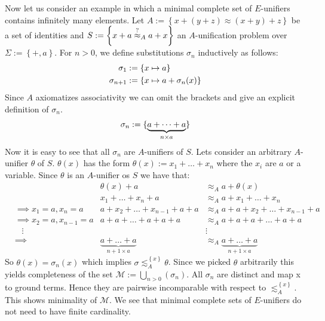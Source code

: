 Now let us consider an example in which a minimal complete set of $E$-unifiers contains infinitely many elements. Let $A:=\left\lbrace x+(y+z)\approx (x+y)+z\right\rbrace $ be a set of identities and $S:=\left\lbrace x+a\stackrel{?}{\approx}_A a+x\right\rbrace$ an $A$-unification problem over $\Sigma:=\left\lbrace +,a\right\rbrace$. For $n>0$, we define substitutions $\sigma_n$ inductively as follows:
\begin{align}
\sigma_1&:=\left\lbrace x\mapsto a\right\rbrace\notag\\
\sigma_{n+1}&:=\left\lbrace x\mapsto a+\sigma_n(x)\right\rbrace\notag
\end{align}
Since $A$ axiomatizes associativity we can omit the brackets and give an explicit definition of $\sigma_n$.
\begin{align}
\sigma_n:=\lbrace\underbrace{a+\dots+a}_{n\times a} \rbrace\notag
\end{align}
Now it is easy to see that all $\sigma_n$ are $A$-unifiers of $S$.
Lets consider an arbitrary $A$-unifier $\theta$ of $S$. $\theta(x)$ has the form $\theta(x):=x_1+\dots+x_n$ where the $x_i$ are $a$ or a variable.
Since $\theta$ is an $A$-unifier os $S$ we have that:
\begin{align*}
&&\theta(x)+a&\approx_A a+\theta(x)\\
&& x_1+\dots+x_n+a&\approx_A a+x_1+\dots+x_n\\
&\implies x_1=a,x_n=a& a+x_2+\dots+x_{n-1}+a+a&\approx_A a+a+x_2+\dots+x_{n-1}+a\\
&\implies x_2=a,x_{n-1}=a& a+a+\dots+a+a+a&\approx_A a+a+a+\dots+a+a\\
&\hspace{10pt}\vdots&&\vdots\\
&\implies&\underbrace{a+\dots+a}_{n+1\times a}&\approx_A \underbrace{a+\dots+a}_{n+1\times a}
\end{align*}
So $\theta(x)=\sigma_n(x)$ which implies $\sigma\lesssim^{\left\lbrace x\right\rbrace }_A\theta$.
Since we picked $\theta$ arbitrarily this yields completeness of the set $\mathcal{M}:=\bigcup_{n>0}\left( \sigma_n\right)$.
All $\sigma_n$ are distinct and map x to ground terms. Hence they are pairwise incomparable with respect to $\lesssim^{\left\lbrace x\right\rbrace }_A$. This shows minimality of $\mathcal{M}$.
We see that minimal complete sets of $E$-unifiers do not need to have finite cardinality.